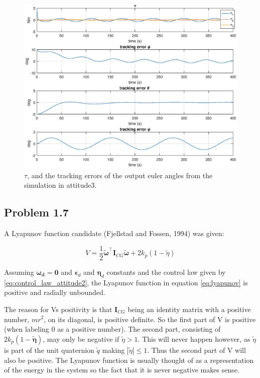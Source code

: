 \begin{figure}[htb]
	\centering
	\includegraphics[width=1.00\textwidth]{figures/3_tau_track.eps}
	\caption{ $\tau$, and the tracking errors of the output euler angles from the simulation in attitude3.}
\label{fig:sim_attitude3_track}
\end{figure}

\subsection*{Problem 1.7}

A Lyapunov function candidate (Fjellstad and Fossen, 1994) was given:

 \begin{equation}
	 V = \frac{1}{2} \tilde{\boldsymbol{\omega}}^{\top} \mathbf{I}_{CG}\tilde{\boldsymbol{\omega}} + 2 k_p (1-\tilde{\eta})
	 \label{eq:lyapunov}
 \end{equation}


Assuming $\boldsymbol{\omega_d }= \mathbf{0}$ and $\boldsymbol{\epsilon}_d$ and $\boldsymbol{\eta}_d$ constants and the control law given by \eqref{eq:control_law_attitude2}, the Lyapunov function in equation \eqref{eq:lyapunov} is positive and radially unbounded. 

The reason for Vs positivity is that $\mathbf{I}_{CG}$ being an identity matrix with a positive number, $mr^2$, on its diagonal, is positive definite. So the first part of V is positive (when labeling 0 as a positive number). The second part, consisting of $2 k_p (1-\tilde{\boldsymbol{\eta}})$, may only be negative if $\tilde{\eta} > 1$. This will never happen however, as $\tilde{\eta}$ is part of the unit quaternion $\tilde{q}$ making $|\tilde{\eta}| \leq 1$. Thus the second part of V will also be positive. The Lyapunov function is usually thought of as a representation of the energy in the system so the fact that it is never negative makes sense. 

